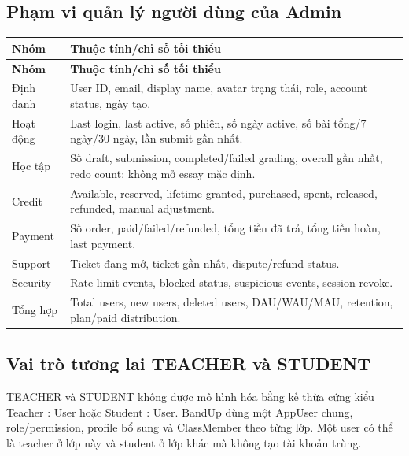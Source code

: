 \documentclass[11pt,a4paper]{article}
\begin{document}
\subsection{Phạm vi quản lý người dùng của Admin}
\small
\setlength{\tabcolsep}{4pt}
\renewcommand{\arraystretch}{1.18}
\begin{longtable}{|P{0.19\textwidth}|P{0.73\textwidth}|}
\hline
\textbf{Nhóm} & \textbf{Thuộc tính/\allowbreak{}chỉ số tối thiểu} \\ \hline
\endfirsthead
\hline
\textbf{Nhóm} & \textbf{Thuộc tính/\allowbreak{}chỉ số tối thiểu} \\ \hline
\endhead
Định danh & User ID, email, display name, avatar trạng thái, role, account status, ngày tạo. \\ \hline
Hoạt động & Last login, last active, số phiên, số ngày active, số bài tổng/\allowbreak{}7 ngày/\allowbreak{}30 ngày, lần submit gần nhất. \\ \hline
Học tập & Số draft, submission, completed/\allowbreak{}failed grading, overall gần nhất, redo count; không mở essay mặc định. \\ \hline
Credit & Available, reserved, lifetime granted, purchased, spent, released, refunded, manual adjustment. \\ \hline
Payment & Số order, paid/\allowbreak{}failed/\allowbreak{}refunded, tổng tiền đã trả, tổng tiền hoàn, last payment. \\ \hline
Support & Ticket đang mở, ticket gần nhất, dispute/\allowbreak{}refund status. \\ \hline
Security & Rate-limit events, blocked status, suspicious events, session revoke. \\ \hline
Tổng hợp & Total users, new users, deleted users, DAU/\allowbreak{}WAU/\allowbreak{}MAU, retention, plan/\allowbreak{}paid distribution. \\ \hline
\end{longtable}
\normalsize
\subsection{Vai trò tương lai TEACHER và STUDENT}
TEACHER và STUDENT không được mô hình hóa bằng kế thừa cứng kiểu Teacher : User hoặc Student : User. BandUp dùng một AppUser chung, role/\allowbreak{}permission, profile bổ sung và ClassMember theo từng lớp. Một user có thể là teacher ở lớp này và student ở lớp khác mà không tạo tài khoản trùng.
\end{document}
